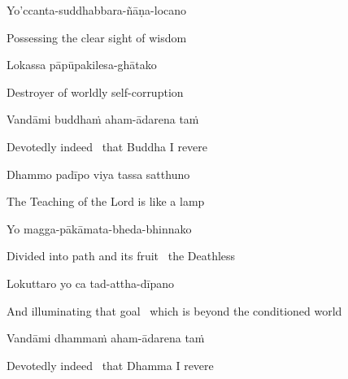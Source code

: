 Yo'ccanta-suddhabbara-ñāṇa-locano

\begin{english}
  Possessing the clear sight of wisdom
\end{english}

Lokassa pāpūpakilesa-ghātako

\begin{english}
  Destroyer of worldly self-corruption
\end{english}

Vandāmi buddhaṁ aham-ādarena taṁ

\begin{english}
  Devotedly indeed \breathmark\ that Buddha I revere
\end{english}

Dhammo padīpo viya tassa satthuno

\begin{english}
    The Teaching of the Lord is like a lamp\makeatletter\hyperlink{endnote8-appendix}\makeatother
\end{english}

Yo magga-pākāmata-bheda-bhinnako

\begin{english}
    Divided into path and its fruit \breathmark\ the Deathless\makeatletter\hyperlink{endnote9-appendix}\makeatother
\end{english}

Lokuttaro yo ca tad-attha-dīpano

\begin{english}
    And illuminating that goal \breathmark\ which is beyond the conditioned world\makeatletter\hyperlink{endnote10-appendix}\makeatother
\end{english}

Vandāmi dhammaṁ aham-ādarena taṁ

\begin{english}
  Devotedly indeed \breathmark\ that Dhamma I revere
\end{english}

